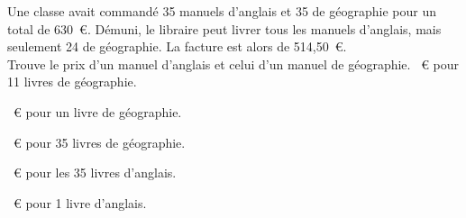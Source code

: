 Une classe avait commandé 35 manuels d'anglais et 35 de géographie
pour un total de 630~\textgreek{\euro}. Démuni, le libraire peut livrer
tous les manuels d'anglais, mais seulement 24 de géographie. La
facture est alors de 514,50~\textgreek{\euro}.
\\Trouve le prix d'un manuel d'anglais et celui d'un manuel de
géographie.
~\textgreek{\euro} pour 11 livres de géographie.
\par
{}~\textgreek{\euro} pour un livre de géographie.\par
{}~\textgreek{\euro} pour 35 livres de géographie.
\par
{}~\textgreek{\euro} pour les 35 livres d'anglais.
\par
{}~\textgreek{\euro} pour 1 livre d'anglais.
